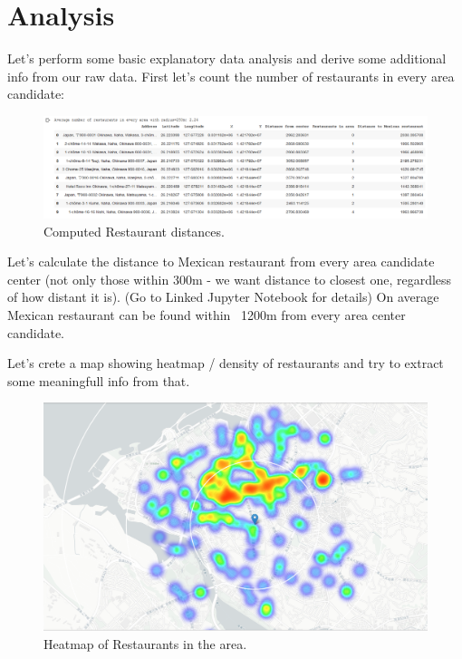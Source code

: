 \documentclass[11pt]{article}
\begin{document}
\section{Analysis}

Let's perform some basic explanatory data analysis and derive some additional info from our raw data. First let's count the number of restaurants in every area candidate:

\begin{figure}[H]
    \centering
        \includegraphics[scale=.4]{figures/cm3.png}
    \caption{Computed Restaurant distances.}
    \label{fig:1}
\end{figure}

Let's calculate the distance to Mexican restaurant from every area candidate center (not only those within 300m - we want distance to closest one, regardless of how distant it is).
(Go to Linked Jupyter Notebook for details)
On average Mexican restaurant can be found within ~1200m from every area center candidate.

Let's crete a map showing heatmap / density of restaurants and try to extract some meaningfull info from that.

\begin{figure}[H]
    \centering
        \includegraphics[scale=.4]{figures/cm4.png}
    \caption{Heatmap of Restaurants in the area.}
    \label{fig:1}
\end{figure}
\end{document}
